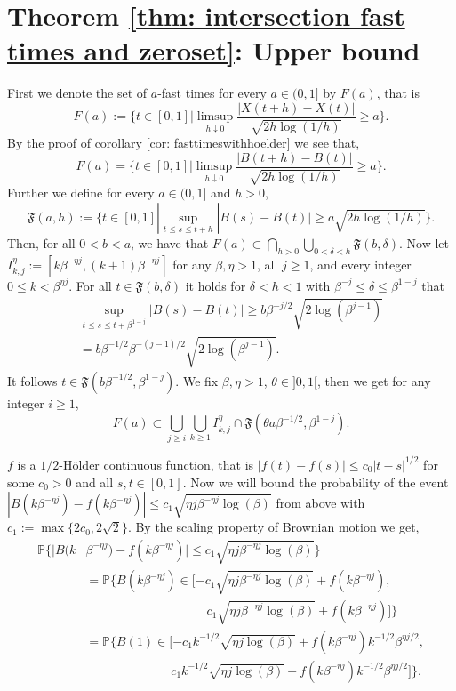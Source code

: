\documentclass[11pt, reqno]{amsart}
\theoremstyle{plain}
\theoremstyle{definition}
\theoremstyle{remark}
\begin{document}
\section{Theorem \ref{thm: intersection fast times and zeroset}: Upper bound} \label{Upper bound - intersection result}
First we denote the set of $a$-fast times for every $a\in(0,1]$ by $F(a)$, that is
\[
F(a) := \Big\{ t\in[0,1] | \limsup_{h \downarrow 0} \frac{|X(t+h)-X(t)|}{\sqrt{2h\log{(1/h)}}} \geq a  \Big\}.
\]
By the proof of corollary \ref{cor: fasttimeswithhoelder} we see that,
\[
F(a) = \Big\{ t\in[0,1] | \limsup_{h \downarrow 0} \frac{|B(t+h)-B(t)|}{\sqrt{2h\log{(1/h)}}} \geq a  \Big\}.
\]
Further we define for every $a\in(0,1]$ and $h>0$,
\[
{\mathfrak{F}} (a,h) := \Big\{ t\in[0,1] | \sup_{t\leq s\leq t+h} |B(s)-B(t)| \geq a{\sqrt{2h\log{(1/h)}}}  \Big\}.
\]
Then, for all $0<b < a$, we have that $F(a) \subset \bigcap_{h>0}\bigcup_{0<\delta<h} {\mathfrak{F}}(b,\delta)$. Now let $I_{k,j}^\eta := [k\beta^{-\eta j}, (k+1)\beta^{-\eta j}]$ for any $\beta, \eta > 1$, all $j \geq 1$, and every integer $0 \leq k < \beta ^{\eta j}$.
For all $t\in {\mathfrak{F}}(b,\delta)$ it holds for $\delta <h <1$ with $\beta^{-j} \leq \delta \leq \beta^{1-j}$ that
\begin{multline}
 \sup_{t\leq s\leq t+\beta^{1-j}} |B(s)-B(t)| \geq b \beta^{-j/2} {\sqrt{2\log{(\beta^{j-1})}}} \\=  b \beta^{-1/2} \beta^{-(j-1)/2} {\sqrt{2\log{(\beta^{j-1})}}}.
\end{multline}
It follows $t\in {\mathfrak{F}}(b\beta^{-1/2},\beta^{1-j})$. We fix $\beta, \eta > 1$, $\theta \in ]0,1[$, then we get for any integer $i\geq 1$,
\[
F(a) \subset \bigcup_{j\geq i}\bigcup_{k\geq 1} I_{k,j}^\eta \cap {\mathfrak{F}}(\theta a\beta^{-1/2},\beta^{1-j}).
\]

$f$ is a $1/2$-{H\"{o}lder } continuous function, that is $|f(t)-f(s)| \leq c_0 |t-s|^{1/2}$ for some $c_0>0$ and all $s,t \in [0,1]$. Now we will bound the probability of the event $ |B(k \beta^{-\eta j})  - f(k\beta^{-\eta j})| \leq c_1 \sqrt{\eta j \beta^{-\eta j} \log(\beta)}$ from above with $c_1:=\max\{2c_0,2\sqrt{2}\}$.
By the scaling property of Brownian motion we get,
\begin{align*}
{\mathbb{P}} \big\{  |B(k &\beta^{-\eta j})  - f(k\beta^{-\eta j})| \leq c_1 \sqrt{\eta j \beta^{-\eta j} \log(\beta)}\big\} \\
&= {\mathbb{P}} \big\{  B(k\beta^{-\eta j})\in [ -c_1 \sqrt{\eta j \beta^{-\eta j} \log(\beta)} + f(k\beta^{-\eta j}), \\
& \ \ \ \ \ \ \  \ \ \ \ \ \ \ \ \ \ \ \ \ \  \ \ \ \ \ \ \ \ \ \ \ \ \ \ \ \ \ \ \ \ \ \ \  c_1 \sqrt{\eta j \beta^{-\eta j} \log(\beta)} + f(k\beta^{-\eta j}) ]\big\} \\
&= {\mathbb{P}} \big\{  B(1) \in [ -c_1 k^{-1/2} \sqrt{\eta j  \log(\beta)} + f(k\beta^{-\eta j})k^{-1/2}\beta^{\eta j/2}, \\
& \ \ \ \ \ \ \ \ \ \ \ \ \ \ \ \ \ \ \ \ \ \ \ \ \ \ \ \ \ \ \ c_1 k^{-1/2}\sqrt{\eta j \log(\beta)} + f(k\beta^{-\eta j})k^{-1/2}\beta^{\eta j/2} ]\big\}.
\end{align*}
\end{document}
